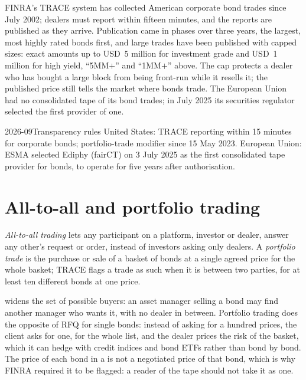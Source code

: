 FINRA's TRACE system has collected American corporate bond trades since July 2002;
dealers must report within fifteen minutes, and the reports are published as they
arrive. Publication came in phases over three years, the largest, most highly rated
bonds first, and large trades have been published with capped sizes: exact amounts
up to USD~5 million for investment grade and USD~1 million for high yield, ``5MM$+$''
and ``1MM$+$'' above. The cap protects a dealer who has bought a large
block from being front-run while it resells it; the published price still tells
the market where bonds trade. The European Union had no consolidated tape of its bond
trades; in July 2025 its securities regulator selected the first provider of one.

\begin{dated}{2026-09}{Transparency rules}\label{dat:m2:how-bonds-trade:transparency}
United States: TRACE reporting within 15 minutes for corporate bonds;
portfolio-trade modifier since 15 May 2023. European Union: ESMA selected Ediphy
(fairCT) on 3 July 2025 as the first consolidated tape provider for bonds, to operate
for five years after authorisation.
\end{dated}

\section{All-to-all and portfolio trading}

\begin{definition}\label{def:m2:how-bonds-trade:a2a}
\emph{All-to-all trading} lets any participant on a
platform, investor or dealer, answer any other's request or order, instead of
investors asking only dealers. A \emph{portfolio trade} is the
purchase or sale of a basket of bonds at a single agreed price for the whole basket;
TRACE flags a trade as such when it is between two parties, for at least ten
different bonds at one price.
\end{definition}

 widens the set of possible buyers: an asset manager selling a
bond may find another manager who wants it, with no dealer in between. Portfolio
trading does the opposite of RFQ for single bonds: instead of asking for a hundred
prices, the client asks for one, for the whole list, and the dealer prices the risk of
the basket, which it can hedge with credit indices and bond ETFs rather than bond by
bond. The price of each bond in a  is not a negotiated price of that
bond, which is why FINRA required it to be flagged: a reader of the tape should not
take it as one.

